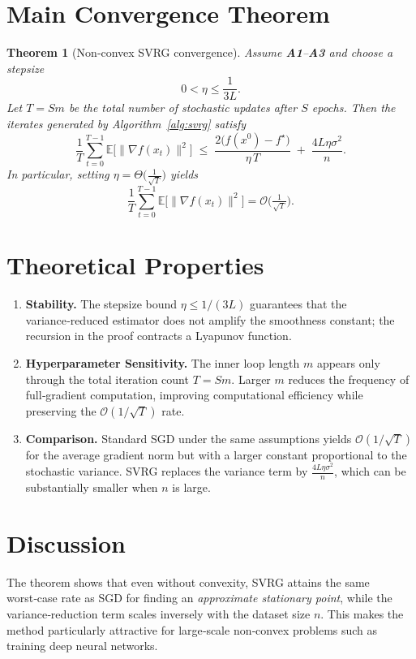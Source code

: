 \documentclass{article}
\newtheorem{theorem}{Theorem}
\newcommand{\E}{\mathbb{E}}
\begin{document}
\section*{Main Convergence Theorem}
\begin{theorem}[Non‑convex SVRG convergence]\label{thm:svrg}
Assume \textbf{A1}–\textbf{A3} and choose a stepsize
\[
0<\eta\le\frac{1}{3L}.
\]
Let $T=S m$ be the total number of stochastic updates after $S$ epochs. Then the iterates generated by Algorithm~\ref{alg:svrg} satisfy
\[
\frac{1}{T}\sum_{t=0}^{T-1}\E\bigl[\|\nabla f(x_t)\|^{2}\bigr]
\;\le\;
\frac{2\bigl(f(x^{0})-f^\star\bigr)}{\eta\,T}
\;+\;
\frac{4L\eta\sigma^{2}}{n}.
\tag{1}
\]
In particular, setting $\eta=\Theta\!\bigl(\frac{1}{\sqrt{T}}\bigr)$ yields
\[
\frac{1}{T}\sum_{t=0}^{T-1}\E\bigl[\|\nabla f(x_t)\|^{2}\bigr]=\mathcal{O}\!\bigl(\tfrac{1}{\sqrt{T}}\bigr).
\]
\end{theorem}

\section*{Theoretical Properties}
\begin{enumerate}[label=\textbf{P\arabic*:}, leftmargin=*]
\item \textbf{Stability.} The stepsize bound $\eta\le 1/(3L)$ guarantees that the variance‑reduced estimator does not amplify the smoothness constant; the recursion in the proof contracts a Lyapunov function.
\item \textbf{Hyperparameter Sensitivity.} The inner loop length $m$ appears only through the total iteration count $T=S m$. Larger $m$ reduces the frequency of full‑gradient computation, improving computational efficiency while preserving the $\mathcal{O}(1/\sqrt{T})$ rate.
\item \textbf{Comparison.} Standard SGD under the same assumptions yields $\mathcal{O}(1/\sqrt{T})$ for the average gradient norm but with a larger constant proportional to the stochastic variance. SVRG replaces the variance term by $\frac{4L\eta\sigma^{2}}{n}$, which can be substantially smaller when $n$ is large.
\end{enumerate}

\section*{Discussion}
The theorem shows that even without convexity, SVRG attains the same worst‑case rate as SGD for finding an \emph{approximate stationary point}, while the variance‑reduction term scales inversely with the dataset size $n$. This makes the method particularly attractive for large‑scale non‑convex problems such as training deep neural networks.
\end{document}
